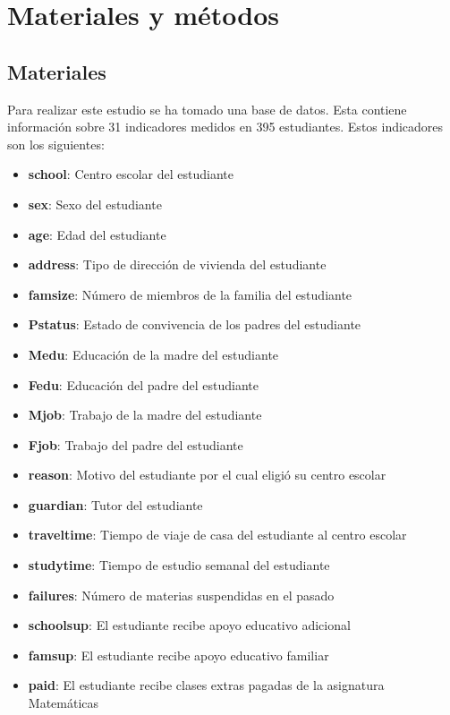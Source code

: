 \documentclass[a4paper, 11pt]{article}
\begin{document}
\section{Materiales y métodos}

\subsection{Materiales}

Para realizar este estudio se ha tomado una base de datos. Esta contiene información sobre 31 indicadores medidos en 395 estudiantes. Estos indicadores son los siguientes:

\begin{itemize}
\item \textbf{school}: Centro escolar del estudiante
\item \textbf{sex}: Sexo del estudiante
\item \textbf{age}: Edad del estudiante
\item \textbf{address}: Tipo de dirección de vivienda del estudiante
\item \textbf{famsize}: Número de miembros de la familia del estudiante
\item \textbf{Pstatus}: Estado de convivencia de los padres del estudiante
\item \textbf{Medu}: Educación de la madre del estudiante
\item \textbf{Fedu}: Educación del padre del estudiante
\item \textbf{Mjob}: Trabajo de la madre del estudiante
\item \textbf{Fjob}: Trabajo del padre del estudiante
\item \textbf{reason}: Motivo del estudiante por el cual eligió su centro escolar
\item \textbf{guardian}: Tutor del estudiante
\item \textbf{traveltime}: Tiempo de viaje de casa del estudiante al centro escolar
\item \textbf{studytime}: Tiempo de estudio semanal del estudiante
\item \textbf{failures}: Número de materias suspendidas en el pasado
\item \textbf{schoolsup}: El estudiante recibe apoyo educativo adicional
\item \textbf{famsup}: El estudiante recibe apoyo educativo familiar
\item \textbf{paid}: El estudiante recibe clases extras pagadas de la asignatura Matemáticas

\end{itemize}
\end{document}
